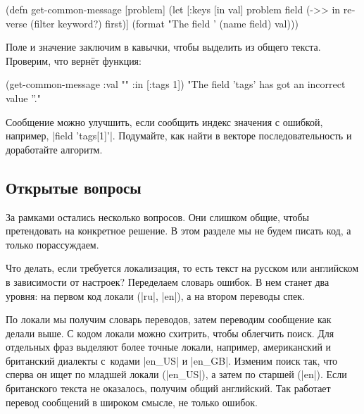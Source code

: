\begin{english}
  \begin{clojure}
(defn get-common-message [problem]
  (let [{:keys [in val]} problem
        field (->> in
                   reverse
                   (filter keyword?)
                   first)]
    (format "The field '%
            (name field) val)))
  \end{clojure}
\end{english}

Поле и значение заключим в кавычки, чтобы выделить из общего текста. Проверим,
что верн\"{е}т функция:

\begin{english}
  \begin{clojure}
(get-common-message {:val "" :in [:tags 1]})
"The field 'tags' has got an incorrect value ''."
  \end{clojure}
\end{english}

Сообщение можно улучшить, если сообщить индекс значения с ошибкой, например,
\spverb|field 'tags[1]'|. Подумайте, как найти в векторе последовательность
 и доработайте алгоритм.

\subsection{Открытые вопросы}

За рамками остались несколько вопросов. Они слишком общие, чтобы претендовать на
конкретное решение. В этом разделе мы не будем писать код, а только
порассуждаем.

Что делать, если требуется локализация, то есть текст на русском или английском
в зависимости от настроек? Переделаем словарь ошибок. В нем станет два уровня:
на первом код локали (\spverb|ru|, \spverb|en|), а на втором переводы спек.


По локали мы получим словарь переводов, затем переводим сообщение как делали
выше. С кодом локали можно схитрить, чтобы облегчить поиск. Для отдельных фраз
выделяют более точные локали, например, американский и британский диалекты
с~кодами \spverb|en_US| и \spverb|en_GB|. Изменим поиск так, что сперва он ищет
по младшей локали (\spverb|en_US|), а затем по старшей (\spverb|en|). Если
британского текста не оказалось, получим общий английский. Так работает перевод
сообщений в широком смысле, не только ошибок.

